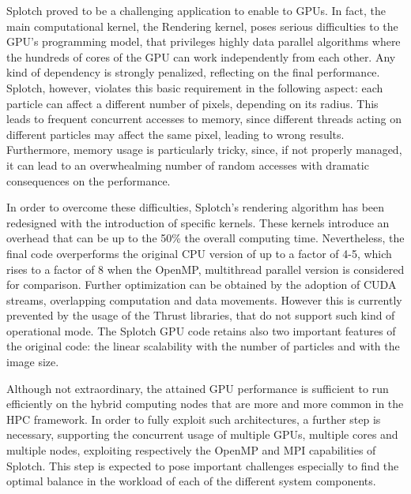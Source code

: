 \documentclass[11pt]{article}
\begin{document}
Splotch proved to be a challenging application to enable to GPUs. 
In fact, the main computational kernel, the Rendering kernel, poses serious difficulties
to the GPU's programming model, that privileges highly data parallel algorithms
where the hundreds of cores of the GPU can work independently from each other.
Any kind of dependency is strongly penalized, reflecting on the final performance.
Splotch, however, violates this basic requirement in the following aspect:
each particle can affect a different number of pixels, depending on its radius.
This leads to frequent concurrent accesses to memory, since
different threads acting on different particles may affect the same pixel,
leading to wrong results. Furthermore, memory usage is particularly 
tricky, since, if not properly managed, 
it can lead to an overwhealming number of random accesses 
with dramatic consequences on the performance.

In order to overcome these difficulties, Splotch's rendering algorithm has been
redesigned with the introduction of specific kernels. These kernels 
introduce an overhead that can be up to the 50\% the overall computing
time. Nevertheless, the final code overperforms the original CPU
version of up to a factor of 4-5, which rises to a factor of 8 when the OpenMP,
multithread parallel version is considered for comparison. Further optimization can
be obtained by the adoption of CUDA streams, overlapping computation 
and data movements. However this is currently prevented by the usage of the 
Thrust libraries, that do not support such kind of operational mode. 
The Splotch GPU code retains also two important features of the original
code: the linear scalability with the number of particles and with the 
image size. 

Although not extraordinary, the attained GPU performance is sufficient 
to run efficiently on the hybrid computing nodes that are more and 
more common in the HPC framework. In order to fully exploit such architectures, 
a further step is necessary, supporting the concurrent usage of 
multiple GPUs, multiple cores and multiple nodes, exploiting respectively the OpenMP and
MPI capabilities of Splotch. This step is expected to pose important 
challenges especially to find the optimal balance in the workload of each of the different 
system components.


	
\end{document}
